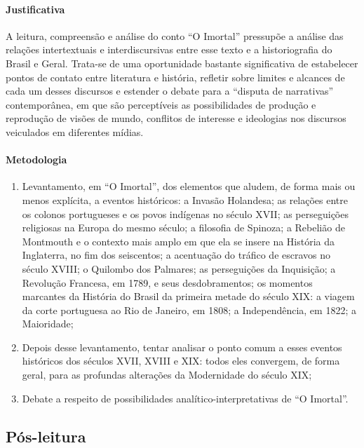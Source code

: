 \documentclass{extarticle}
\begin{document}
\paragraph{Justificativa} A leitura, compreensão e análise do conto ``O
Imortal'' pressupõe a análise das relações intertextuais e
interdiscursivas entre esse texto e a historiografia do Brasil e Geral.
Trata-se de uma oportunidade bastante significativa de estabelecer
pontos de contato entre literatura e história, refletir sobre limites e
alcances de cada um desses discursos e estender o debate para a
``disputa de narrativas'' contemporânea, em que são perceptíveis as
possibilidades de produção e reprodução de visões de mundo, conflitos de
interesse e ideologias nos discursos veiculados em diferentes mídias.

\paragraph{Metodologia}
\begin{enumerate}
\item Levantamento, em ``O Imortal'', dos elementos que aludem, de forma
mais ou menos explícita, a eventos históricos: a Invasão Holandesa; as
relações entre os colonos portugueses e os povos indígenas no século
XVII; as perseguições religiosas na Europa do mesmo século; a filosofia
de Spinoza; a Rebelião de Montmouth e o contexto mais amplo em que ela
se insere na História da Inglaterra, no fim dos seiscentos; a acentuação
do tráfico de escravos no século XVIII; o Quilombo dos Palmares; as
perseguições da Inquisição; a Revolução Francesa, em 1789, e seus
desdobramentos; os momentos marcantes da História do Brasil da primeira
metade do século XIX: a viagem da corte portuguesa ao Rio de Janeiro, em
1808; a Independência, em 1822; a Maioridade;

\item Depois desse levantamento, tentar analisar o ponto comum a esses
eventos históricos dos séculos XVII, XVIII e XIX: todos eles convergem,
de forma geral, para as profundas alterações da Modernidade do século
XIX;

\item Debate a respeito de possibilidades analítico-interpretativas de ``O
Imortal''.
\end{enumerate}

\subsection{Pós-leitura}
\end{document}
